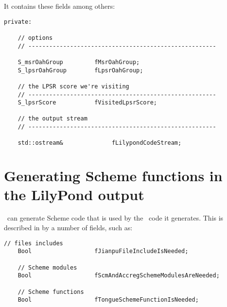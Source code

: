 It contains these fields among others:
\begin{lstlisting}[language=CPlusPlus]
  private:

    // options
    // ------------------------------------------------------

    S_msrOahGroup         fMsrOahGroup;
    S_lpsrOahGroup        fLpsrOahGroup;

    // the LPSR score we're visiting
    // ------------------------------------------------------
    S_lpsrScore           fVisitedLpsrScore;

    // the output stream
    // ------------------------------------------------------

    std::ostream&              fLilypondCodeStream;
\end{lstlisting}


\section{Generating Scheme functions in the LilyPond output}

\xmlToLy\ can generate Scheme code that is used by the \lily\ code it generates. This is described in  by a number of  fields, such as:
\begin{lstlisting}[language=CPlusPlus]
    // files includes
    Bool                  fJianpuFileIncludeIsNeeded;

    // Scheme modules
    Bool                  fScmAndAccregSchemeModulesAreNeeded;

    // Scheme functions
    Bool                  fTongueSchemeFunctionIsNeeded;
\end{lstlisting}



